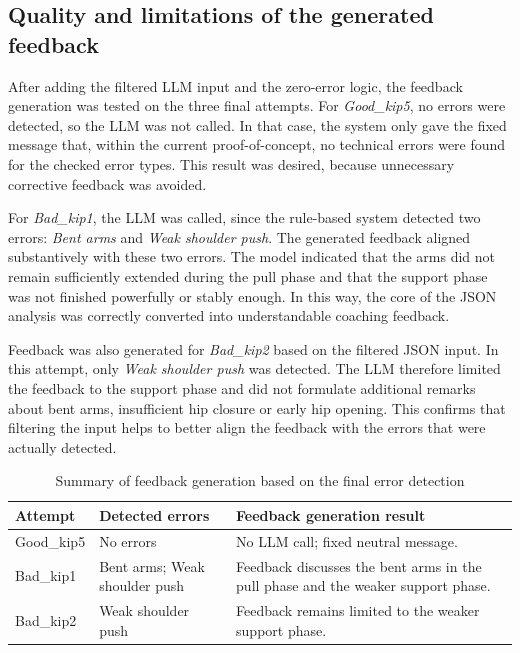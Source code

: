 \subsection{Quality and limitations of the generated feedback}

After adding the filtered LLM input and the zero-error logic, the feedback generation was tested on the three final attempts. For \textit{Good\_kip5}, no errors were detected, so the LLM was not called. In that case, the system only gave the fixed message that, within the current proof-of-concept, no technical errors were found for the checked error types. This result was desired, because unnecessary corrective feedback was avoided.

For \textit{Bad\_kip1}, the LLM was called, since the rule-based system detected two errors: \textit{Bent arms} and \textit{Weak shoulder push}. The generated feedback aligned substantively with these two errors. The model indicated that the arms did not remain sufficiently extended during the pull phase and that the support phase was not finished powerfully or stably enough. In this way, the core of the JSON analysis was correctly converted into understandable coaching feedback.

Feedback was also generated for \textit{Bad\_kip2} based on the filtered JSON input. In this attempt, only \textit{Weak shoulder push} was detected. The LLM therefore limited the feedback to the support phase and did not formulate additional remarks about bent arms, insufficient hip closure or early hip opening. This confirms that filtering the input helps to better align the feedback with the errors that were actually detected.

\begin{table}[H]
    \centering
    \footnotesize
    \begin{tabular}{p{2.6cm}p{4.2cm}p{5.8cm}}
        \toprule
        \textbf{Attempt} & \textbf{Detected errors} & \textbf{Feedback generation result} \\
        \midrule
        Good\_kip5 & No errors & No LLM call; fixed neutral message. \\
        Bad\_kip1 & Bent arms; Weak shoulder push & Feedback discusses the bent arms in the pull phase and the weaker support phase. \\
        Bad\_kip2 & Weak shoulder push & Feedback remains limited to the weaker support phase. \\
        \bottomrule
    \end{tabular}
    \caption{Summary of feedback generation based on the final error detection}
    \label{tab:llm_feedback_summary}
\end{table}

